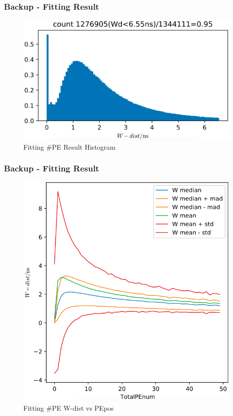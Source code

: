 \documentclass{beamer}
\begin{document}
\begin{frame}[noframenumbering]
\thispagestyle{empty}
\frametitle{Backup - Fitting Result}
\begin{figure}
    \centering
    \caption{Fitting \#PE Result Histogram}
    \includegraphics[width=0.85\linewidth]{img/xiaopeippenumhist.png}
\end{figure}
\end{frame}

\begin{frame}[noframenumbering]
\thispagestyle{empty}
\frametitle{Backup - Fitting Result}
\setlength{\abovecaptionskip}{0mm}
\setlength{\belowcaptionskip}{0mm}
\begin{figure}
    \centering
    \caption{Fitting \#PE W-dist vs PEpos}
    \includegraphics[width=0.65\linewidth]{img/xiaopeippenumstats.png}
\end{figure}
\end{frame}
\end{document}
